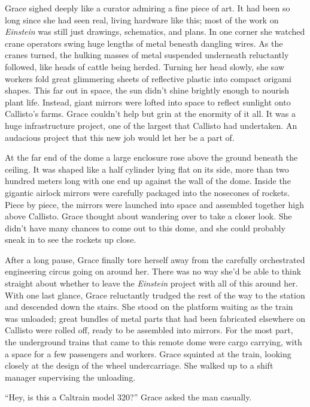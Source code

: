\documentclass[12pt]{article} %
\begin{document}
Grace sighed deeply like a curator admiring a fine piece of art. It had been so long since she had seen real, living hardware like this; most of the work on \textit{Einstein} was still just drawings, schematics, and plans. In one corner she watched crane operators swing huge lengths of metal beneath dangling wires. As the cranes turned, the hulking masses of metal suspended underneath reluctantly followed, like heads of cattle being herded. Turning her head slowly, she saw workers fold great glimmering sheets of reflective plastic into compact origami shapes. This far out in space, the sun didn't shine brightly enough to nourish plant life. Instead, giant mirrors were lofted into space to reflect sunlight onto Callisto's farms. Grace couldn't help but grin at the enormity of it all. It was a huge infrastructure project, one of the largest that Callisto had undertaken. An audacious project that this new job would let her be a part of.

At the far end of the dome a large enclosure rose above the ground beneath the ceiling. It was shaped like a half cylinder lying flat on its side, more than two hundred meters long with one end up against the wall of the dome. Inside the gigantic airlock mirrors were carefully packaged into the nosecones of rockets. Piece by piece, the mirrors were launched into space and assembled together high above Callisto. Grace thought about wandering over to take a closer look. She didn't have many chances to come out to this dome, and she could probably sneak in to see the rockets up close.

After a long pause, Grace finally tore herself away from the carefully orchestrated engineering circus going on around her. There was no way she'd be able to think straight about whether to leave the \textit{Einstein} project with all of this around her. With one last glance, Grace reluctantly trudged the rest of the way to the station and descended down the stairs. She stood on the platform waiting as the train was unloaded; great bundles of metal parts that had been fabricated elsewhere on Callisto were rolled off, ready to be assembled into mirrors. For the most part, the underground trains that came to this remote dome were cargo carrying, with a space for a few passengers and workers. Grace squinted at the train, looking closely at the design of the wheel undercarriage. She walked up to a shift manager supervising the unloading.

``Hey, is this a Caltrain model 320?'' Grace asked the man casually.
\end{document}
